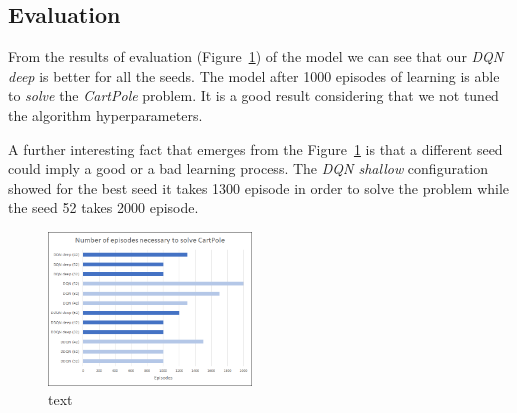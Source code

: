 \subsection{Evaluation}

From the results of evaluation (Figure~\ref{fig:comparison}) of the model we can see that our \textit{DQN deep} is better for all the seeds. The model after 1000 episodes of learning is able to \textit{solve} the \textit{CartPole} problem. It is a good result considering that we not tuned the algorithm hyperparameters.

A further interesting fact that emerges from the Figure~\ref{fig:comparison} is that a different seed could imply a good or a bad learning process. The \textit{DQN shallow} configuration showed for the best seed it takes 1300 episode in order to solve the problem while the seed 52 takes 2000 episode.

\begin{figure}
	\centering
	\includegraphics[width=0.48\textwidth]{res/Comparison}
	\caption{text}
	\label{fig:comparison}
\end{figure}
